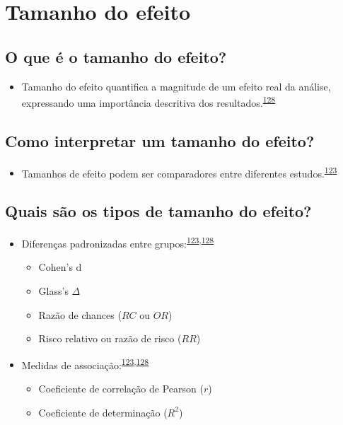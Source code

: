 \documentclass[
  a4paper,
]{book}
\providecommand{\tightlist}{%
  \setlength{\itemsep}{0pt}\setlength{\parskip}{0pt}}
\begin{document}
\hypertarget{tamanho-efeito}{%
\section{Tamanho do efeito}\label{tamanho-efeito}}

\hypertarget{o-que-uxe9-o-tamanho-do-efeito}{%
\subsection{O que é o tamanho do efeito?}\label{o-que-uxe9-o-tamanho-do-efeito}}

\begin{itemize}
\tightlist
\item
  Tamanho do efeito quantifica a magnitude de um efeito real da análise, expressando uma importância descritiva dos resultados.\textsuperscript{\protect\hyperlink{ref-Kim2015}{128}}
\end{itemize}

\hypertarget{como-interpretar-um-tamanho-do-efeito}{%
\subsection{Como interpretar um tamanho do efeito?}\label{como-interpretar-um-tamanho-do-efeito}}

\begin{itemize}
\tightlist
\item
  Tamanhos de efeito podem ser comparadores entre diferentes estudos.\textsuperscript{\protect\hyperlink{ref-Sullivan2012}{123}}
\end{itemize}

\hypertarget{quais-suxe3o-os-tipos-de-tamanho-do-efeito}{%
\subsection{Quais são os tipos de tamanho do efeito?}\label{quais-suxe3o-os-tipos-de-tamanho-do-efeito}}

\begin{itemize}
\item
  Diferenças padronizadas entre grupos:\textsuperscript{\protect\hyperlink{ref-Sullivan2012}{123},\protect\hyperlink{ref-Kim2015}{128}}

  \begin{itemize}
  \item
    Cohen's d
  \item
    Glass's \(\Delta\)
  \item
    Razão de chances (\(RC\) ou \(OR\))
  \item
    Risco relativo ou razão de risco (\(RR\))
  \end{itemize}
\item
  Medidas de associação:\textsuperscript{\protect\hyperlink{ref-Sullivan2012}{123},\protect\hyperlink{ref-Kim2015}{128}}

  \begin{itemize}
  \item
    Coeficiente de correlação de Pearson (\(r\))
  \item
    Coeficiente de determinação (\(R^2\))
  \end{itemize}
\end{itemize}
\end{document}

